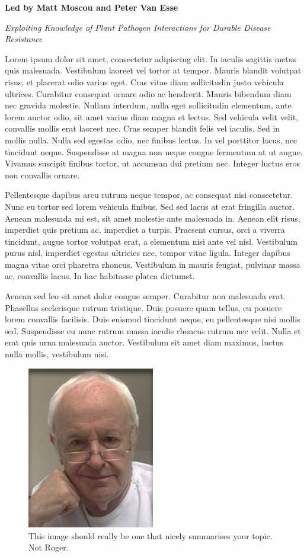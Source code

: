 \documentclass[12pt,]{book}
\begin{document}
\textbf{Led by Matt Moscou and Peter Van Esse}

\emph{Exploiting Knowledge of Plant Pathogen Interactions for Durable
Disease Resistance}

Lorem ipsum dolor sit amet, consectetur adipiscing elit. In iaculis
sagittis metus quis malesuada. Vestibulum laoreet vel tortor at tempor.
Mauris blandit volutpat risus, et placerat odio varius eget. Cras vitae
diam sollicitudin justo vehicula ultrices. Curabitur consequat ornare
odio ac hendrerit. Mauris bibendum diam nec gravida molestie. Nullam
interdum, nulla eget sollicitudin elementum, ante lorem auctor odio, sit
amet varius diam magna et lectus. Sed vehicula velit velit, convallis
mollis erat laoreet nec. Cras semper blandit felis vel iaculis. Sed in
mollis nulla. Nulla sed egestas odio, nec finibus lectus. In vel
porttitor lacus, nec tincidunt neque. Suspendisse at magna non neque
congue fermentum at ut augue. Vivamus suscipit finibus tortor, ut
accumsan dui pretium nec. Integer luctus eros non convallis ornare.

Pellentesque dapibus arcu rutrum neque tempor, ac consequat nisi
consectetur. Nunc eu tortor sed lorem vehicula finibus. Sed sed lacus at
erat fringilla auctor. Aenean malesuada mi est, sit amet molestie ante
malesuada in. Aenean elit risus, imperdiet quis pretium ac, imperdiet a
turpis. Praesent cursus, orci a viverra tincidunt, augue tortor volutpat
erat, a elementum nisi ante vel nisl. Vestibulum purus nisl, imperdiet
egestas ultricies nec, tempor vitae ligula. Integer dapibus magna vitae
orci pharetra rhoncus. Vestibulum in mauris feugiat, pulvinar massa ac,
convallis lacus. In hac habitasse platea dictumst.

Aenean sed leo sit amet dolor congue semper. Curabitur non malesuada
erat. Phasellus scelerisque rutrum tristique. Duis posuere quam tellus,
eu posuere lorem convallis facilisis. Duis euismod tincidunt neque, eu
pellentesque nisi mollis sed. Suspendisse eu nunc rutrum massa iaculis
rhoncus rutrum nec velit. Nulla et erat quis urna malesuada auctor.
Vestibulum sit amet diam maximus, luctus nulla mollis, vestibulum nisi.

\begin{figure}
\includegraphics[width=2.19in]{assets/RPF-thumbnail} \caption{This image should really be one that nicely summarises your topic. Not Roger.}\label{fig:maint}
\end{figure}
\end{document}
